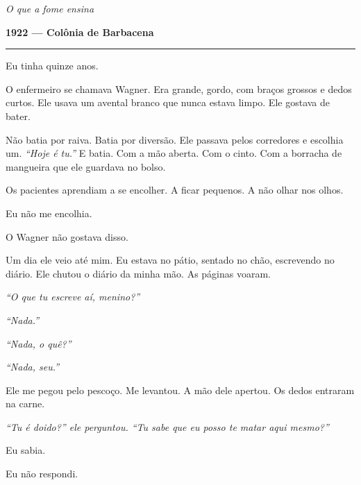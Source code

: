 
\noindent \textit{O que a fome ensina}

\noindent \textbf{1922 --- Colônia de Barbacena}

\vspace{0.5em}\noindent\rule{\textwidth}{0.5pt}\vspace{0.5em}

\noindent Eu tinha quinze anos.

\noindent O enfermeiro se chamava Wagner. Era grande, gordo, com braços grossos e dedos curtos. Ele usava um avental branco que nunca estava limpo. Ele gostava de bater.

\noindent Não batia por raiva. Batia por diversão. Ele passava pelos corredores e escolhia um. \textit{\textquotedblleft{}Hoje é tu.\textquotedblright{}} E batia. Com a mão aberta. Com o cinto. Com a borracha de mangueira que ele guardava no bolso.

\noindent Os pacientes aprendiam a se encolher. A ficar pequenos. A não olhar nos olhos.

\noindent Eu não me encolhia.

\noindent O Wagner não gostava disso.

\noindent Um dia ele veio até mim. Eu estava no pátio, sentado no chão, escrevendo no diário. Ele chutou o diário da minha mão. As páginas voaram.

\noindent \textit{\textquotedblleft{}O que tu escreve aí, menino?\textquotedblright{}}

\noindent \textit{\textquotedblleft{}Nada.\textquotedblright{}}

\noindent \textit{\textquotedblleft{}Nada, o quê?\textquotedblright{}}

\noindent \textit{\textquotedblleft{}Nada, seu.\textquotedblright{}}

\noindent Ele me pegou pelo pescoço. Me levantou. A mão dele apertou. Os dedos entraram na carne.

\noindent \textit{\textquotedblleft{}Tu é doido?\textquotedblright{}\textit{ ele perguntou. }\textquotedblleft{}Tu sabe que eu posso te matar aqui mesmo?\textquotedblright{}}

\noindent Eu sabia.

\noindent Eu não respondi.

